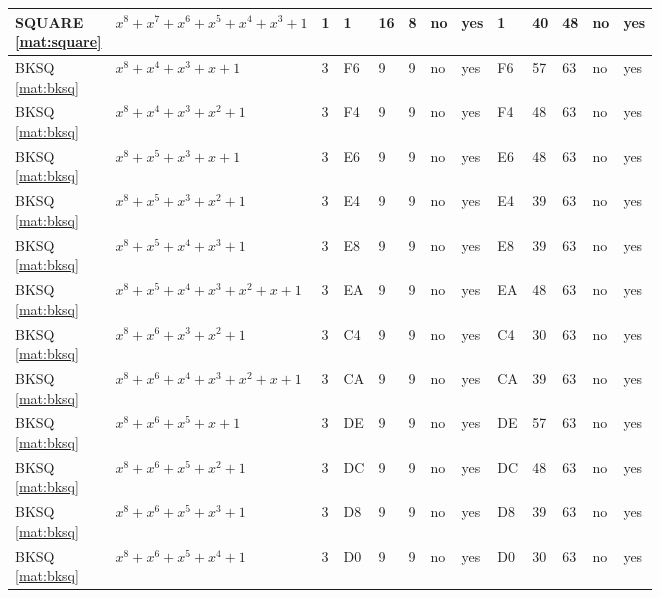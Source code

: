 \begin{tiny}
\begin{longtable}{|l|l|l|l|l|l|l|l|l|l|l|l|l|}
\shortstack{SQUARE \\ \eqref{mat:square}} & $x^8 + x^7 + x^6 + x^5 + x^4 + x^3 + 1$ & 1 & 1 & 16 & 8 & no & yes & 1 & 40 & 48 & no & yes \\ \hline
\shortstack{BKSQ \\ \eqref{mat:bksq}} & $x^8 + x^4 + x^3 + x + 1$ & 3 & F6 & 9 & 9 & no & yes & F6 & 57 & 63 & no & yes \\ \hline
\shortstack{BKSQ \\ \eqref{mat:bksq}} & $x^8 + x^4 + x^3 + x^2 + 1$ & 3 & F4 & 9 & 9 & no & yes & F4 & 48 & 63 & no & yes \\ \hline
\shortstack{BKSQ \\ \eqref{mat:bksq}} & $x^8 + x^5 + x^3 + x + 1$ & 3 & E6 & 9 & 9 & no & yes & E6 & 48 & 63 & no & yes \\ \hline
\shortstack{BKSQ \\ \eqref{mat:bksq}} & $x^8 + x^5 + x^3 + x^2 + 1$ & 3 & E4 & 9 & 9 & no & yes & E4 & 39 & 63 & no & yes \\ \hline
\shortstack{BKSQ \\ \eqref{mat:bksq}} & $x^8 + x^5 + x^4 + x^3 + 1$ & 3 & E8 & 9 & 9 & no & yes & E8 & 39 & 63 & no & yes \\ \hline
\shortstack{BKSQ \\ \eqref{mat:bksq}} & $x^8 + x^5 + x^4 + x^3 + x^2 + x + 1$ & 3 & EA & 9 & 9 & no & yes & EA & 48 & 63 & no & yes \\ \hline
\shortstack{BKSQ \\ \eqref{mat:bksq}} & $x^8 + x^6 + x^3 + x^2 + 1$ & 3 & C4 & 9 & 9 & no & yes & C4 & 30 & 63 & no & yes \\ \hline
\shortstack{BKSQ \\ \eqref{mat:bksq}} & $x^8 + x^6 + x^4 + x^3 + x^2 + x + 1$ & 3 & CA & 9 & 9 & no & yes & CA & 39 & 63 & no & yes \\ \hline
\shortstack{BKSQ \\ \eqref{mat:bksq}} & $x^8 + x^6 + x^5 + x + 1$ & 3 & DE & 9 & 9 & no & yes & DE & 57 & 63 & no & yes \\ \hline
\shortstack{BKSQ \\ \eqref{mat:bksq}} & $x^8 + x^6 + x^5 + x^2 + 1$ & 3 & DC & 9 & 9 & no & yes & DC & 48 & 63 & no & yes \\ \hline
\shortstack{BKSQ \\ \eqref{mat:bksq}} & $x^8 + x^6 + x^5 + x^3 + 1$ & 3 & D8 & 9 & 9 & no & yes & D8 & 39 & 63 & no & yes \\ \hline
\shortstack{BKSQ \\ \eqref{mat:bksq}} & $x^8 + x^6 + x^5 + x^4 + 1$ & 3 & D0 & 9 & 9 & no & yes & D0 & 30 & 63 & no & yes \\ \hline

\end{longtable}
\end{tiny}
